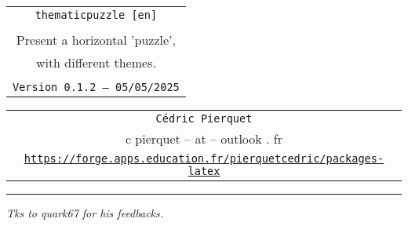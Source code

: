 \documentclass[11pt,a4paper]{ltxdoc}
\def\TPversion{0.1.2}
\def\TPdate{05/05/2025}
\begin{document}
\pagestyle{fancy}

\thispagestyle{empty}

\begin{center}
	\begin{minipage}{0.88\linewidth}
	\begin{tcolorbox}[colframe=yellow,colback=yellow!15]
		\begin{center}
			\begin{tabular}{c}
				{\Huge \texttt{thematicpuzzle [en]}}\\
				\\
				{\LARGE Present a horizontal 'puzzle',} \\
				{\LARGE with different themes.} \\
				\\
				{\small \texttt{Version \TPversion{} -- \TPdate}}
		\end{tabular}
		\end{center}
	\end{tcolorbox}
\end{minipage}
\end{center}

\begin{center}
	\begin{tabular}{c}
	\texttt{Cédric Pierquet}\\
	{\ttfamily c pierquet -- at -- outlook . fr}\\
	\texttt{\url{https://forge.apps.education.fr/pierquetcedric/packages-latex}} \\
\end{tabular}
\end{center}

\hrule

\vfill

\begin{tcolorbox}[colframe=lightgray,colback=lightgray!5,halign=center]
\end{tcolorbox}

\begin{tcolorbox}[colframe=lightgray,colback=lightgray!5,halign=center]
\ThematicPuzzle[Thickness=1.25pt,Scale=2.75,BgColors={yellow!10,orange!10,green!10,teal!10,purple!10},Labels={Angry,Python,Cool,Apple,Battery},BorderColor=darkgray,IconsColor=teal!50!black]{\faAngry,\faPython,\faAngellist,\faApple*,\faBatteryHalf}
\end{tcolorbox}

\vfill

\hfill{\footnotesize\itshape Tks to quark67 for his feedbacks.}
\end{document}

